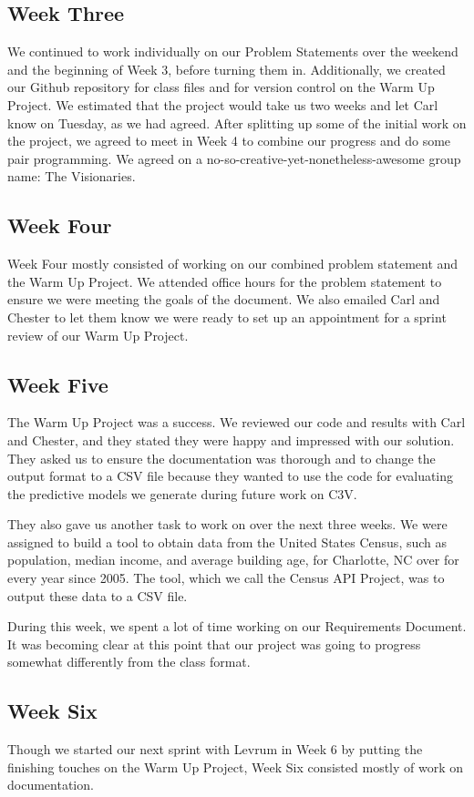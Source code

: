 \documentclass[onecolumn, draftclsnofoot,10pt, compsoc]{IEEEtran}
\begin{document}
\begin{singlespace}
\subsection{Week Three}
We continued to work individually on our Problem Statements over the weekend and the beginning of Week 3, before turning them in. 
Additionally, we created our Github repository for class files and for version control on the Warm Up Project. 
We estimated that the project would take us two weeks and let Carl know on Tuesday, as we had agreed.
After splitting up some of the initial work on the project, we agreed to meet in Week 4 to combine our progress and do some pair programming.
We agreed on a no-so-creative-yet-nonetheless-awesome group name: The Visionaries.

\subsection{Week Four}
Week Four mostly consisted of working on our combined problem statement and the Warm Up Project.
We attended office hours for the problem statement to ensure we were meeting the goals of the document.
We also emailed Carl and Chester to let them know we were ready to set up an appointment for a sprint review of our Warm Up Project.

\subsection{Week Five}
The Warm Up Project was a success.
We reviewed our code and results with Carl and Chester, and they stated they were happy and impressed with our solution.
They asked us to ensure the documentation was thorough and to change the output format to a CSV file because they wanted to use the code for evaluating the predictive models we generate during future work on C3V.

They also gave us another task to work on over the next three weeks. 
We were assigned to build a tool to obtain data from the United States Census, such as population, median income, and average building age, for Charlotte, NC over for every year since 2005.
The tool, which we call the Census API Project, was to output these data to a CSV file.

During this week, we spent a lot of time working on our Requirements Document. 
It was becoming clear at this point that our project was going to progress somewhat differently from the class format.

\subsection{Week Six} \label{week6}
Though we started our next sprint with Levrum in Week 6 by putting the finishing touches on the Warm Up Project, Week Six consisted mostly of work on documentation.


\end{singlespace}
\end{document}
